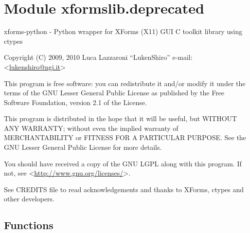 %
%
%


\section{Module xformslib.deprecated}

    \label{xformslib:deprecated}

xforms-python - Python wrapper for XForms (X11) GUI C toolkit library
using ctypes

Copyright (C) 2009, 2010  Luca Lazzaroni ``LukenShiro''
e-mail: <\href{mailto:lukenshiro@ngi.it}{lukenshiro@ngi.it}>

This program is free software: you can redistribute it and/or modify
it under the terms of the GNU Lesser General Public License as
published by the Free Software Foundation, version 2.1 of the License.

This program is distributed in the hope that it will be useful,
but WITHOUT ANY WARRANTY; without even the implied warranty of
MERCHANTABILITY or FITNESS FOR A PARTICULAR PURPOSE. See the
GNU Lesser General Public License for more details.

You should have received a copy of the GNU LGPL along with this
program. If not, see <\href{http://www.gnu.org/licenses/}{http://www.gnu.org/licenses/}>.

See CREDITS file to read acknowledgements and thanks to XForms,
ctypes and other developers.


  \subsection{Functions}

    \label{xformslib:deprecated:warn_deprecated_function}

